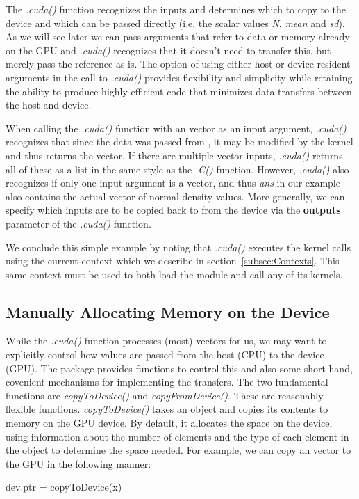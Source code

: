 \documentclass[article]{jss}
\def\R{\proglang{R}}
\def\Rpkg#1{\pkg{#1}}
\def\Rfunc#1{\textsl{#1()}}
\def\Rvar#1{\textsl{#1}}
\def\Rarg#1{\textbf{#1}}
\begin{document}
The \Rfunc{.cuda} function recognizes the inputs and determines which
to copy to the device and which can be passed directly (i.e. the
scalar values \Rvar{N}, \Rvar{mean} and \Rvar{sd}). As we will see later
we can pass arguments that refer to data or memory already on the
GPU and \Rfunc{.cuda} recognizes that it doesn't need to transfer
this, but merely pass the reference as-is. The option of using 
either host or device resident arguments in the call to \Rfunc{.cuda}
provides flexibility and simplicity while retaining the ability to
produce highly efficient code that minimizes data transfers between
the host and device.


When calling the \Rfunc{.cuda} function with an \R{} vector as an input argument,
\Rfunc{.cuda} recognizes that since the data was passed from \R{}, it 
may be modified by the kernel and thus returns the vector.  If
there are multiple vector inputs, \Rfunc{.cuda} returns all of these as
a list in the same style as the \Rfunc{.C} function. However, \Rfunc{.cuda}
also recognizes if only one input argument is a vector, and thus \Rvar{ans} in
our example also contains the actual vector of normal density values.  More
generally, we can specify which inputs are to be copied back to \R{}
from the device via the \Rarg{outputs} parameter of the \Rfunc{.cuda}
function.

We conclude this simple example by noting that \Rfunc{.cuda} executes the kernel calls using
the current context which we describe in section~\ref{subsec:Contexts}. 
This same context must be used to both load the module and call any of its kernels.

\subsection{Manually Allocating Memory on the Device}\label{subsec:memory}
While the \Rfunc{.cuda} function processes (most) \R{} vectors for us,
we may want to explicitly control how values are passed from the
host (CPU) to the device (GPU). The \Rpkg{RCUDA} package provides
functions to control this and also some short-hand, covenient
mechanisms for implementing the transfers.  The two fundamental
functions are \Rfunc{copyToDevice} and \Rfunc{copyFromDevice}.  These
are reasonably flexible functions.  \Rfunc{copyToDevice} takes an \R{}
object and copies its contents to memory on the GPU device.  By
default, it allocates the space on the device, using information about
the number of elements and the type of each element in the \R{} object
to determine the space needed.  For example, we can copy an \R{}
vector to the GPU in the following manner:
\begin{RCode}
dev.ptr = copyToDevice(x)
\end{RCode}
\end{document}
